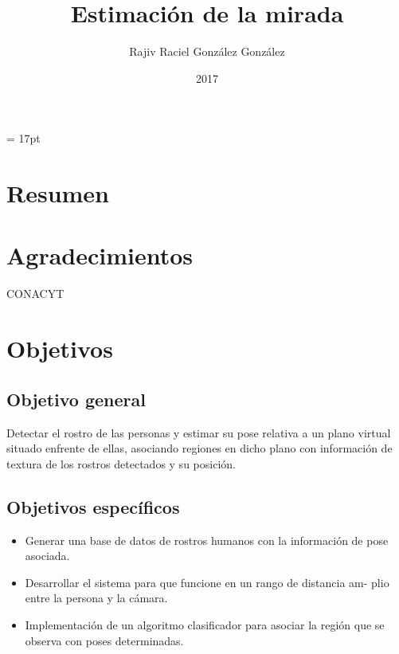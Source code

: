 \documentclass[12pt,oneside]{book}
\begin{document}
\baselineskip = 17pt


\title{ Estimación de la mirada}
\author{Rajiv Raciel González González}
\date{2017}
\maketitle 
\frontmatter

\chapter{Resumen}


\tableofcontents




\listoffigures





\chapter{Agradecimientos}

CONACYT




\mainmatter

\chapter{Objetivos}
\section{Objetivo general}

Detectar el rostro de las personas y estimar su pose relativa a un plano virtual situado enfrente de ellas, asociando regiones en dicho plano con información de textura de los rostros detectados y su posición. 
 \section{Objetivos específicos}
   \begin{itemize}
   	\item Generar una base de datos de rostros humanos con la información de
   	pose asociada.
   	\item Desarrollar el sistema para que funcione en un rango de distancia am-
   	plio entre la persona y la cámara.
   	\item Implementación de un algoritmo clasificador para asociar la región que
   	se observa con poses determinadas.
   \end{itemize}
   
\end{document}
